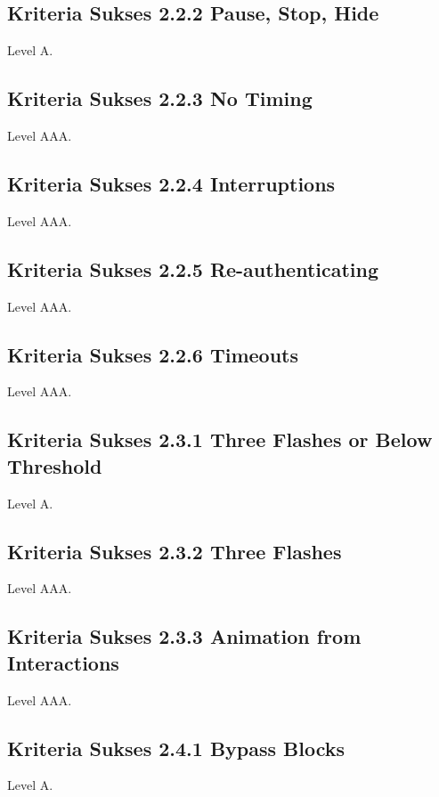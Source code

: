\subsection{Kriteria Sukses 2.2.2 Pause, Stop, Hide}
\label{sec:kriteria_2.2.2}
Level A.

\subsection{Kriteria Sukses 2.2.3 No Timing}
\label{sec:kriteria_2.2.3}
Level AAA.

\subsection{Kriteria Sukses 2.2.4 Interruptions}
\label{sec:kriteria_2.2.4}
Level AAA.

\subsection{Kriteria Sukses 2.2.5 Re-authenticating}
\label{sec:kriteria_2.2.5}
Level AAA.

\subsection{Kriteria Sukses 2.2.6 Timeouts}
\label{sec:kriteria_2.2.6}
Level AAA.

\subsection{Kriteria Sukses 2.3.1 Three Flashes or Below Threshold}
\label{sec:kriteria_2.3.1}
Level A.

\subsection{Kriteria Sukses 2.3.2 Three Flashes}
\label{sec:kriteria_2.3.2}
Level AAA.

\subsection{Kriteria Sukses 2.3.3 Animation from Interactions}
\label{sec:kriteria_2.3.3}
Level AAA.

\subsection{Kriteria Sukses 2.4.1 Bypass Blocks}
\label{sec:kriteria_2.4.1}
Level A.

